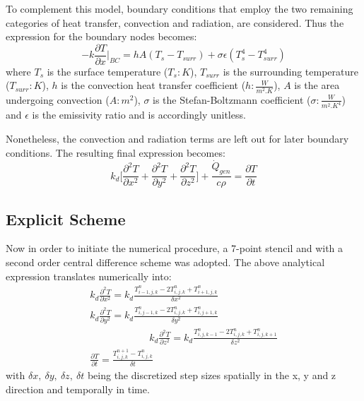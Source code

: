 \documentclass[a4paper,10pt]{IEEEtran}
\begin{document}
	To complement this model, boundary conditions that employ the two remaining categories of heat transfer, convection and radiation, are considered. Thus the expression for the boundary nodes becomes:
	\begin{equation}
		-k\frac{\partial T}{\partial x}\Bigg |_{BC} = hA(T_{s} - T_{surr})+\sigma \epsilon (T_s^4 - T_{surr}^4)
	\end{equation}
	where $T_s$ is the surface temperature ($T_s: K$), $T_{surr}$ is the surrounding temperature ($T_{surr}: K$), $h$ is the convection heat transfer coefficient ($h: \frac{W}{m^2.K}$), $A$ is the area undergoing convection ($A: m^2$), $\sigma$ is the Stefan-Boltzmann coefficient ($\sigma: \frac{W}{m^2.K^4}$) and $\epsilon$ is the emissivity ratio and is accordingly unitless.
	
	Nonetheless, the convection and radiation terms are left out for later boundary conditions. The resulting final expression becomes:
	\begin{equation}
		k_d\Bigg[ \frac{\partial^2 T}{\partial x^2}+\frac{\partial^2 T}{\partial y^2}+\frac{\partial^2 T}{\partial z^2} \Bigg] + \frac{\dot{Q}_{gen}}{c\rho} = \frac{\partial T}{\partial t}
	\end{equation}
	\subsection{Explicit Scheme}
	Now in order to initiate the numerical procedure, a 7-point stencil and with a second order central difference scheme was adopted. The above analytical expression translates numerically into:
	\begin{multline}
		k_d\frac{\partial^2 T}{\partial x^2}=k_d\frac{T_{i-1,j,k}^n-2T_{i,j,k}^n+T_{i+1,j,k}^n}{\delta x^2}\\ 
		k_d\frac{\partial^2 T}{\partial y^2}=k_d\frac{T_{i,j-1,k}^n-2T_{i,j,k}^n+T_{i,j+1,k}^n}{\delta y^2}\\
		\qquad \qquad \qquad k_d\frac{\partial^2 T}{\partial z^2}=k_d\frac{T_{i,j,k-1}^n-2T_{i,j,k}^n+T_{i,j,k+1}^n}{\delta z^2}\\
		\frac{\partial T}{\partial t} = \frac{T_{i,j,k}^{n+1}-T_{i,j,k}^{n}}{\delta t}
	\end{multline}
	with $\delta x,\ \delta y,\ \delta z,\ \delta t$ being the discretized step sizes spatially in the x, y and z direction and temporally in time. 
	
\end{document}
